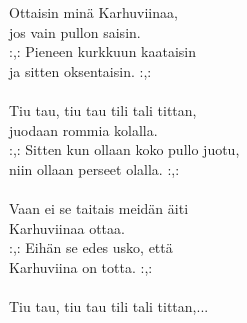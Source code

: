 
            Ottaisin minä Karhuviinaa, \\
            jos vain pullon saisin. \\
            :,: Pieneen kurkkuun kaataisin \\
            ja sitten oksentaisin. :,: \\
\hspace{10mm} \\
            Tiu tau, tiu tau tili tali tittan, \\
            juodaan rommia kolalla. \\
            :,: Sitten kun ollaan koko pullo juotu, \\
            niin ollaan perseet olalla. :,: \\
\hspace{10mm} \\
            Vaan ei se taitais meidän äiti \\
            Karhuviinaa ottaa. \\
            :,: Eihän se edes usko, että \\
            Karhuviina on totta. :,: \\
\hspace{10mm} \\
            Tiu tau, tiu tau tili tali tittan,... \\
